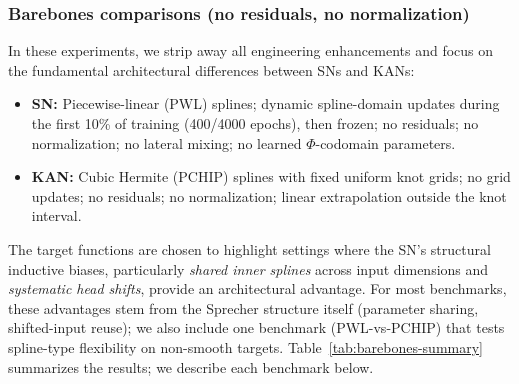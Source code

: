 \documentclass{article}
\theoremstyle{plain}
\theoremstyle{definition}
\theoremstyle{remark}
\begin{document}
\subsubsection{Barebones comparisons (no residuals, no normalization)}\label{sssec:barebones}

In these experiments, we strip away all engineering enhancements and focus on the fundamental architectural differences between SNs and KANs:
\begin{itemize}[leftmargin=*,nosep]
\item \textbf{SN:} Piecewise-linear (PWL) splines; dynamic spline-domain updates during the first 10\% of training (400/4000 epochs), then frozen; no residuals; no normalization; no lateral mixing; no learned $\Phi$-codomain parameters.
\item \textbf{KAN:} Cubic Hermite (PCHIP) splines with fixed uniform knot grids; no grid updates; no residuals; no normalization; linear extrapolation outside the knot interval.
\end{itemize}

\noindent The target functions are chosen to highlight settings where the SN's structural inductive biases, particularly \emph{shared inner splines} across input dimensions and \emph{systematic head shifts}, provide an architectural advantage. For most benchmarks, these advantages stem from the Sprecher structure itself (parameter sharing, shifted-input reuse); we also include one benchmark (PWL-vs-PCHIP) that tests spline-type flexibility on non-smooth targets. Table~\ref{tab:barebones-summary} summarizes the results; we describe each benchmark below.
\end{document}

